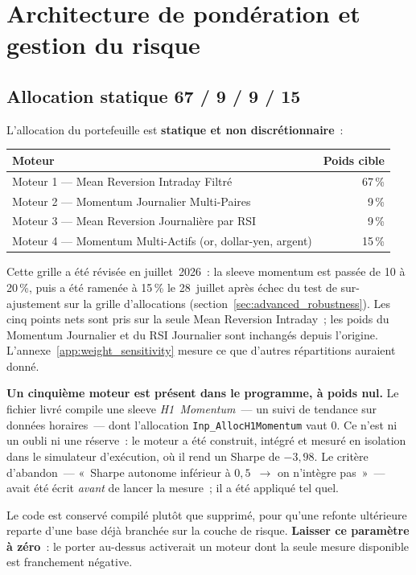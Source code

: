 \section{Architecture de pondération et gestion du risque}
\label{sec:overlay}

\subsection{Allocation statique 67 / 9 / 9 / 15}

L'allocation du portefeuille est \textbf{statique et non discrétionnaire}~:

\begin{center}
\renewcommand{\arraystretch}{1.25}
\begin{tabular}{lr}
\toprule
\textbf{Moteur} & \textbf{Poids cible} \\
\midrule
Moteur 1 --- Mean Reversion Intraday Filtré & 67\,\% \\
Moteur 2 --- Momentum Journalier Multi-Paires & 9\,\% \\
Moteur 3 --- Mean Reversion Journalière par RSI & 9\,\% \\
Moteur 4 --- Momentum Multi-Actifs (or, dollar-yen, argent) & 15\,\% \\
\bottomrule
\end{tabular}
\end{center}

Cette grille a été révisée en juillet~2026~: la sleeve momentum est passée de 10 à 20\,\%, puis a été ramenée à 15\,\% le 28~juillet après échec du test de sur-ajustement sur la grille d'allocations (section~\ref{sec:advanced_robustness}). Les cinq points nets sont pris sur la seule Mean Reversion Intraday~; les poids du Momentum Journalier et du RSI Journalier sont inchangés depuis l'origine. L'annexe~\ref{app:weight_sensitivity} mesure ce que d'autres répartitions auraient donné.

\begin{insightbox}
\textbf{Un cinquième moteur est présent dans le programme, à poids nul.} Le fichier livré compile une sleeve \emph{H1~Momentum}~--- un suivi de tendance sur données horaires~--- dont l'allocation \texttt{Inp\_AllocH1Momentum} vaut $0$. Ce n'est ni un oubli ni une réserve~: le moteur a été construit, intégré et mesuré en isolation dans le simulateur d'exécution, où il rend un Sharpe de $-3{,}98$. Le critère d'abandon~--- «~Sharpe autonome inférieur à $0{,}5$~$\rightarrow$ on n'intègre pas~»~--- avait été écrit \emph{avant} de lancer la mesure~; il a été appliqué tel quel.

\smallskip
Le code est conservé compilé plutôt que supprimé, pour qu'une refonte ultérieure reparte d'une base déjà branchée sur la couche de risque. \textbf{Laisser ce paramètre à zéro}~: le porter au-dessus activerait un moteur dont la seule mesure disponible est franchement négative.
\end{insightbox}

